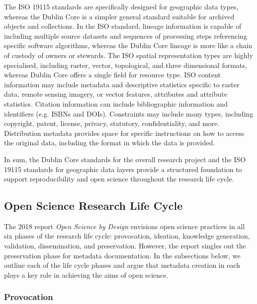 \documentclass{isprs} %
\begin{document}
The ISO 19115 standards are specifically designed for geographic data types, whereas the Dublin Core is a simpler general standard suitable for archived objects and collections.
In the ISO standard, lineage information is capable of including multiple source datasets and sequences of processing steps referencing specific software algorithms, whereas the Dublin Core lineage is more like a chain of custody of owners or stewards.
The ISO spatial representation types are highly specialised, including raster, vector, topological, and three dimensional formats, whereas Dublin Core offers a single field for resource type. 
ISO content information may include metadata and descriptive statistics specific to raster data, remote sensing imagery, or vector features, attributes and attribute statistics. 
Citation information can include bibliographic information and identifiers (e.g. ISBNs and DOIs). 
Constraints may include many types, including copyright, patent, license, privacy, statutory, confidentiality, and more. 
Distribution metadata provides space for specific instructions on how to access the original data, including the format in which the data is provided.

In sum, the Dublin Core standards for the overall research project and the ISO 19115 standards for geographic data layers provide a structured foundation to support reproducibility and open science throughout the research life cycle.

\subsection{Open Science Research Life Cycle}\label{sec:lifecycle}

The 2018 \citeauthor{NASEM2018} report \textit{Open Science by Design} envisions open science practices in all six phases of the research life cycle: provocation, ideation, knowledge generation, validation, dissemination, and preservation. 
However, the report singles out the preservation phase for metadata documentation.
In the subsections below, we outline each of the life cycle phases and argue that metadata creation in each plays a key role in achieving the aims of open science.

\subsubsection{Provocation}
\end{document}
